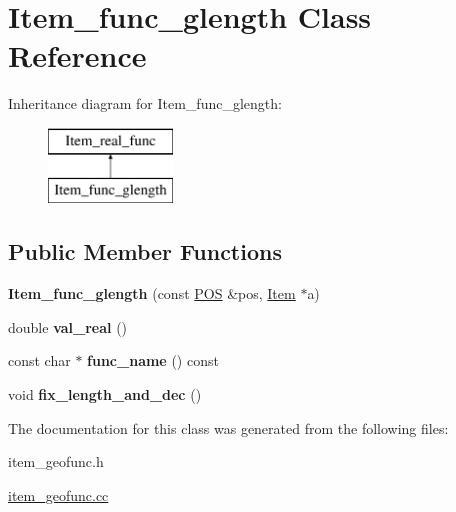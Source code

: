\hypertarget{classItem__func__glength}{}\section{Item\+\_\+func\+\_\+glength Class Reference}
\label{classItem__func__glength}
Inheritance diagram for Item\+\_\+func\+\_\+glength\+:\begin{figure}[H]
\begin{center}
\leavevmode
\includegraphics[height=2.000000cm]{classItem__func__glength}
\end{center}
\end{figure}
\subsection*{Public Member Functions}
\begin{DoxyCompactItemize}
\item 
\mbox{\label{classItem__func__glength_a16a279e9fe07771b6a746c4dc244f9d7}} 
{\bfseries Item\+\_\+func\+\_\+glength} (const \mbox{\hyperlink{structYYLTYPE}{P\+OS}} \&pos, \mbox{\hyperlink{classItem}{Item}} $\ast$a)
\item 
\mbox{\label{classItem__func__glength_a1e1079d51d108502c859ebb18877673d}} 
double {\bfseries val\+\_\+real} ()
\item 
\mbox{\label{classItem__func__glength_a404dc9372266a5725ceedcb146b4ffbd}} 
const char $\ast$ {\bfseries func\+\_\+name} () const
\item 
\mbox{\label{classItem__func__glength_a9ac80cb31287239fbc7b8efa63f52f71}} 
void {\bfseries fix\+\_\+length\+\_\+and\+\_\+dec} ()
\end{DoxyCompactItemize}


The documentation for this class was generated from the following files\+:\begin{DoxyCompactItemize}
\item 
item\+\_\+geofunc.\+h\item 
\mbox{\hyperlink{item__geofunc_8cc}{item\+\_\+geofunc.\+cc}}\end{DoxyCompactItemize}
